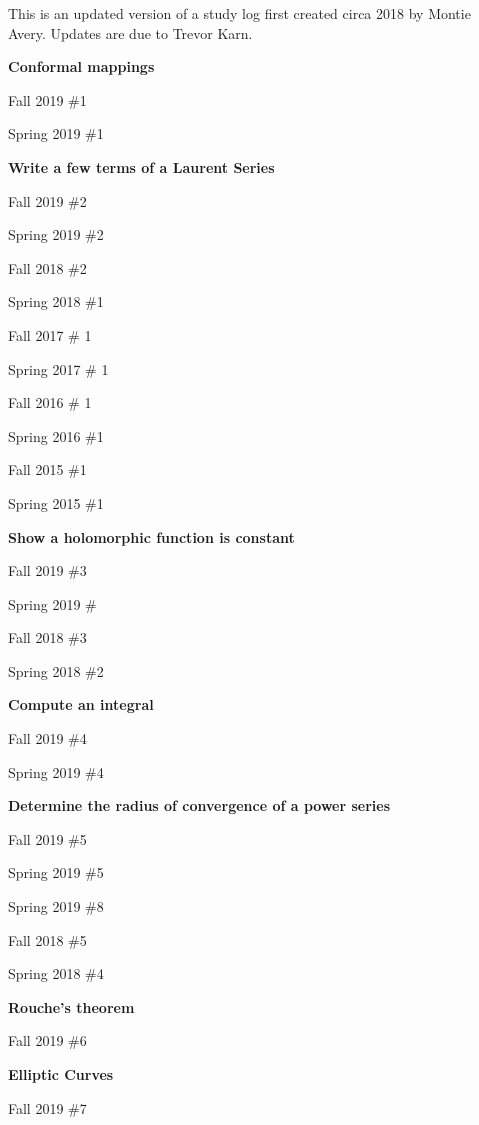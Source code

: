 \documentclass{article}
\begin{document}
\noindent This is an updated version of a study log first created circa 2018 by Montie Avery.
Updates are due to Trevor Karn.

\hfill

\textbf{Conformal mappings}
\begin{todolist}
	\item Fall 2019 \#1
	\item Spring 2019 \#1
\end{todolist}

\textbf{Write a few terms of a Laurent Series}
\begin{todolist}
	\item Fall 2019 \#2
	\item Spring 2019 \#2
	\item Fall 2018 \#2
	\item Spring 2018 \#1
	\item Fall 2017 \# 1
	\item Spring 2017 \# 1
	\item Fall 2016 \# 1
	\item Spring 2016 \#1
	\item Fall 2015 \#1 
	\item Spring 2015 \#1
\end{todolist}

\textbf{Show a holomorphic function is constant}
\begin{todolist}
	\item Fall 2019 \#3
	\item Spring 2019 \#
	\item Fall 2018 \#3
	\item Spring 2018 \#2
\end{todolist}

\textbf{Compute an integral}
\begin{todolist}
	\item Fall 2019 \#4
	\item Spring 2019 \#4
\end{todolist}

\textbf{Determine the radius of convergence of a power series}
\begin{todolist}
	\item Fall 2019 \#5
	\item Spring 2019 \#5
	\item Spring 2019 \#8
	\item Fall 2018 \#5
	\item Spring 2018 \#4
\end{todolist}

\textbf{Rouche's theorem}
\begin{todolist}
	\item Fall 2019 \#6
	\item 
\end{todolist}

\textbf{Elliptic Curves}
\begin{todolist}
	\item Fall 2019 \#7
\end{todolist}
\end{document}
